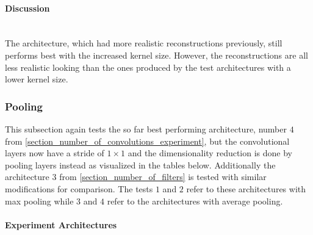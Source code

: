 \paragraph{Discussion} \mbox{} \\


The architecture, which had more realistic reconstructions previously, still performs best with the increased
kernel size. However, the reconstructions are all less realistic looking than the ones produced by the 
test architectures with a lower kernel size.

\pagebreak
\subsubsection{Pooling}

This subsection again tests the so far best performing architecture, number $4$ from  
\autoref{section_number_of_convolutions_experiment}, but the convolutional layers now have a stride of $1\times1$
and the dimensionality reduction is done by pooling layers instead as visualized in the tables below. 
Additionally the architecture $3$ from \autoref{section_number_of_filters} is tested 
with similar modifications for comparison. The tests $1$ and $2$ refer to these architectures with max pooling
while $3$ and $4$ refer to the architectures with average pooling.


\paragraph{Experiment Architectures}

